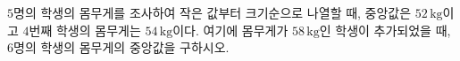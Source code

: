 $5$명의 학생의 몸무게를 조사하여 작은 값부터 크기순으로 나열할 때, 중앙값은 $52\,\mathrm{kg}$이고 $4$번째 학생의 몸무게는 $54\,\mathrm{kg}$이다. 여기에 몸무게가 $58\,\mathrm{kg}$인 학생이 추가되었을 때, $6$명의 학생의 몸무게의 중앙값을 구하시오.
